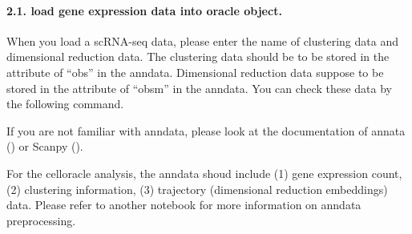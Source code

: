 \documentclass[letterpaper,10pt,english]{sphinxmanual}
\begin{document}
{
\begin{sphinxVerbatim}[commandchars=\\\{\}]
\llap{\color{nbsphinxin}[8]:\,\hspace{\fboxrule}\hspace{\fboxsep}}
  
\end{sphinxVerbatim}
}


\paragraph{2.1. load gene expression data into oracle object.}
\label{\detokenize{notebooks/04_Network_analysis/Network_analysis_with_with_Paul_etal_2015_data:2.1.-load-gene-expression-data-into-oracle-object.}}
When you load a scRNA-seq data, please enter the name of clustering data and dimensional reduction data. The clustering data should be to be stored in the attribute of “obs” in the anndata. Dimensional reduction data suppose to be stored in the attribute of “obsm” in the anndata. You can check these data by the following command.

If you are not familiar with anndata, please look at the documentation of annata () or Scanpy ().

For the celloracle analysis, the anndata shoud include (1) gene expression count, (2) clustering information, (3) trajectory (dimensional reduction embeddings) data. Please refer to another notebook for more information on anndata preprocessing.

{
\begin{sphinxVerbatim}[commandchars=\\\{\}]
\llap{\color{nbsphinxin}[9]:\,\hspace{\fboxrule}\hspace{\fboxsep}}
 
 
\end{sphinxVerbatim}
}
\end{document}
